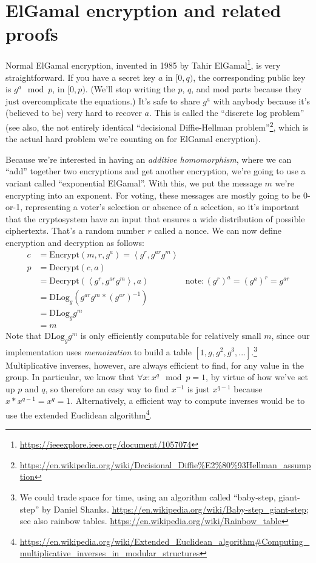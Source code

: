 \section{ElGamal encryption and related proofs}
Normal ElGamal encryption, invented in 1985 by Tahir
ElGamal\footnote{\url{https://ieeexplore.ieee.org/document/1057074}}, is very straightforward. If
you have a secret key $a$ in $[0,q)$, the corresponding public key is
$g^a \mod p$, in $[0,p)$. (We'll stop writing the $p$, $q$, and mod
parts because they just overcomplicate the equations.) It's safe to
share $g^a$ with anybody because it's (believed to be) very hard to recover
$a$. This is called the ``discrete log problem'' (see also, the
not entirely identical ``decisional Diffie-Hellman
problem''\footnote{\url{https://en.wikipedia.org/wiki/Decisional_Diffie\%E2\%80\%93Hellman_assumption}},
which is the actual hard problem we're counting on for ElGamal
encryption).

Because we're interested in having an {\em additive homomorphism},
where we can ``add'' together two encryptions and get another
encryption, we're going to use a variant called ``exponential
ElGamal''. With this, we put the message $m$ we're encrypting
into an exponent. For voting, these messages are mostly going to
be 0-or-1, representing a voter's selection or absence of a selection,
so it's important that the cryptosystem have an input that ensures
a wide distribution of possible ciphertexts. That's a random number
$r$ called a nonce. We can now define encryption and decryption as
follows:
\begin{align*}
c &= \mathrm{Encrypt}(m, r, g^a) = \left<g^r, g^{ar}g^m\right> \\
p &= \mathrm{Decrypt}(c, a) \\
  &= \mathrm{Decrypt}(\left<g^r, g^{ar}g^m\right>, a) & \mathrm{note:} \left({g^r}\right)^a = \left({g^a}\right)^r = g^{ar} \\
  &= \mathrm{DLog}_g\left(g^{ar}g^m * \left(g^{ar}\right)^{-1}\right) \\
  &= \mathrm{DLog}_gg^m \\
  &= m
\end{align*}
Note that $\mathrm{DLog}_gg^m$ is only efficiently computable for
relatively small $m$, since our implementation uses {\em memoization}
to build a table $\left[1, g, g^2,
g^3, ...\right]$.\footnote{We could trade space for time, using an
algorithm called ``baby-step, giant-step'' by Daniel Shanks.
\url{https://en.wikipedia.org/wiki/Baby-step_giant-step}; see also
rainbow tables. \url{https://en.wikipedia.org/wiki/Rainbow_table}} Multiplicative inverses, however, are always
efficient to find, for any value in the group. In particular, we know
that $\forall x: x^q \mod p = 1$, by virtue of how we've set up $p$
and $q$, so therefore an easy way to find $x^{-1}$ is just $x^{q-1}$
because $x * x^{q-1} = x^q = 1$. Alternatively, a efficient way to
compute inverses would be to use the extended Euclidean algorithm\footnote{\url{https://en.wikipedia.org/wiki/Extended\_Euclidean\_algorithm\#Computing\_multiplicative\_inverses\_in\_modular\_structures}}.


